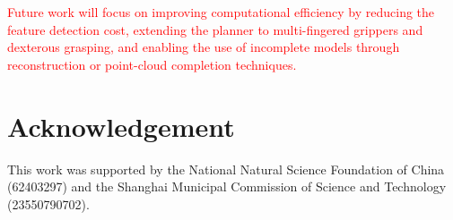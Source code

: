 \documentclass[journal]{IEEEtran}
\newcommand{\rev}[1]{\textcolor{red}{#1}}
\begin{document}
\rev{Future work will focus on improving computational efficiency by reducing the feature detection cost, extending the planner to multi-fingered grippers and dexterous grasping, and enabling the use of incomplete models through reconstruction or point-cloud completion techniques.}


\section{Acknowledgement}
This work was supported by the National Natural Science Foundation of China (62403297) and the Shanghai Municipal Commission of Science and Technology (23550790702).



\end{document}
